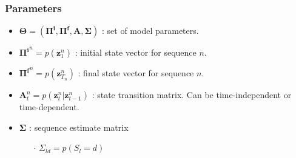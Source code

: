 \documentclass[10pt]{article}
\begin{document}
\subsubsection{Parameters}
\begin{itemize}
\item $\mathbf{\Theta} = (\mathbf{\Pi^i},\mathbf{\Pi^f},\mathbf{A},\mathbf{\Sigma})$ : set of model parameters.
\item $\mathbf{\Pi^i}^n = p(\mathbf{z}_1^n)$ : initial state vector for sequence $n$.
\item $\mathbf{\Pi^f}^n = p(\mathbf{z}_{T_n}^n)$ : final state vector for sequence $n$.
\item $\mathbf{A}_t^n = p(\mathbf{z}_{t}^n|\mathbf{z}_{t-1}^n)$ : state transition matrix. Can be time-independent or time-dependent.
\item $\mathbf{\Sigma}$ : sequence estimate matrix
\begin{itemize}
  \item[$\cdot$] $\Sigma_{ld} = p(S_l=d)$
\end{itemize}
\end{itemize}
\end{document}
